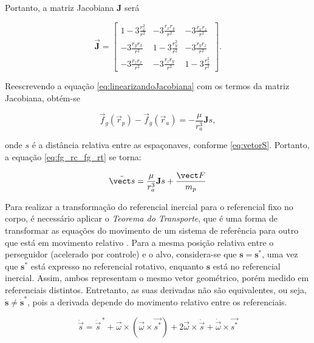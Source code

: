 Portanto, a matriz Jacobiana $\mathbf{J}$ será

\begin{equation}
    \label{eq:jacobianaGenerica}
\vec {\mathbf{J}} = 
\begin{bmatrix}
1 - 3\frac{r_x^2}{r^2} &  -3\frac{r_x r_y}{r^2} &  -3\frac{r_x r_z}{r^2} \\
-3\frac{r_y r_x}{r^2} & 1 - 3\frac{r_y^2}{r^2} & -3\frac{r_y r_z}{r^2} \\
-3\frac{r_z r_x}{r^2} & -3\frac{r_z r_y}{r^2} & 1 - 3\frac{r_z^2}{r^2}
\end{bmatrix}.
\end{equation}

Reescrevendo a equação \eqref{eq:linearizandoJacobiana} com os termos da matriz Jacobiana, obtém-se

\begin{equation}
\label{eq:linearizandoJacobiana2}
\vec f_g(\vec r_{p}) - \vec f_g(\vec r_{a}) = -\frac{\mu}{r_{a}^3} \mathbf{J}s,
\end{equation}

onde $s$ é a distância relativa entre as espaçonaves, conforme \eqref{eq:vetorS}.
Portanto, a equação \eqref{eq:fg_rc_fg_rt} se torna:

\begin{equation}
\label{eq:fg_rc_fg_rt_linearizada}  
\ddot{\vect s} = \frac{\mu}{r_{a}^3} \mathbf{J}s + \frac{\vect F}{m_{p}}
\end{equation}

Para realizar a transformação do referencial inercial para o referencial fixo no corpo, é necessário aplicar o \emph{Teorema do Transporte}, que é uma forma de transformar as equações do movimento de um sistema de referência para outro que está em movimento relativo \cite{wie2008space, symon1979}.
Para a mesma posição relativa entre o perseguidor (acelerado por controle) e o alvo, considera-se que
$\mathbf{s} = \mathbf{s}^*$,
uma vez que
$\mathbf{s}^*$
está expresso no referencial rotativo, enquanto $\mathbf{s}$ está no referencial inercial.
Assim, ambos representam o mesmo vetor geométrico, porém medido em referenciais distintos. Entretanto, as suas derivadas não são equivalentes, ou seja, $\dot{\mathbf{s}} \neq \dot{\mathbf{s}}^*$, pois a derivada depende do movimento relativo entre os referenciais.

\begin{equation}
\label{eq:TransporteSymon1979}
\ddot{\vec s} = 
\ddot{\vec s}^{\,*}
+\vec{\omega} \times (\vec \omega \times \vec {s^*})
+2 \vec{\omega} \times \dot{ \vec{s}}
+ \dot{\vec{\omega}} \times \vec{s^*}
\end{equation}

